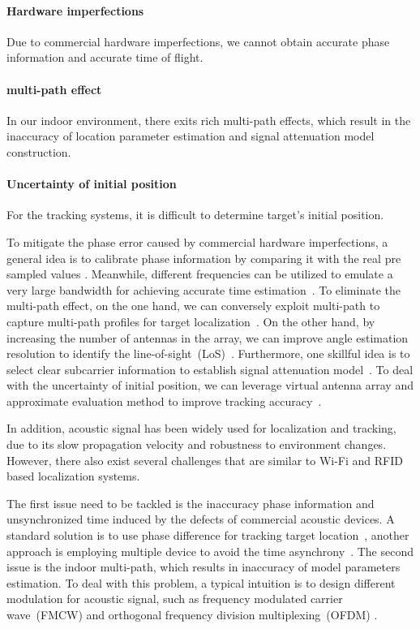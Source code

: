 \paragraph*{Hardware imperfections} Due to commercial hardware imperfections, we cannot obtain accurate phase information and accurate time of
flight.

\paragraph*{multi-path effect} In our indoor environment, there exits rich  multi-path effects, which result in the inaccuracy of location
parameter estimation and signal attenuation model construction.

\paragraph*{Uncertainty of initial position} For the tracking systems, it is difficult to determine target's initial position.



 To mitigate the phase error caused by commercial hardware imperfections, a general idea is to calibrate phase information by comparing it
 with the real pre sampled values \cite{Wang2016D}. Meanwhile, different frequencies can be utilized to emulate a very large bandwidth for
 achieving accurate time estimation~\cite{RFind}. To eliminate the multi-path effect, on the one hand, we can conversely exploit multi-path
 to capture multi-path profiles for target localization~\cite{PinIt}. On the other hand, by increasing the number of antennas in the array,
 we can improve angle estimation resolution to identify the line-of-sight~(LoS)~\cite{Arraytrack, Spotfi}. Furthermore, one skillful idea
 is to select clear subcarrier information to establish signal attenuation model~\cite{wang2016lifs}. To deal with the uncertainty of
 initial position, we can leverage virtual antenna array and approximate evaluation method to improve tracking accuracy~\cite{Tagoram}.

In addition, acoustic signal has been widely used for localization and tracking, due to its slow propagation velocity and robustness to
environment changes. However, there also exist several challenges that are similar to Wi-Fi and RFID based localization systems.

The first issue need to be tackled is the inaccuracy phase information and unsynchronized time induced by the defects of commercial
acoustic devices. A standard solution is to use phase difference for tracking target location~\cite{LLAP}, another approach is employing
multiple device to avoid the time asynchrony~\cite{BeepBeep}.  The second issue is the indoor multi-path, which results in inaccuracy of
model parameters estimation. To deal with this problem, a typical intuition is to design different modulation for acoustic signal, such as
frequency modulated carrier wave~(FMCW) and orthogonal frequency division multiplexing~(OFDM) \cite{CAT,STRATA}.

